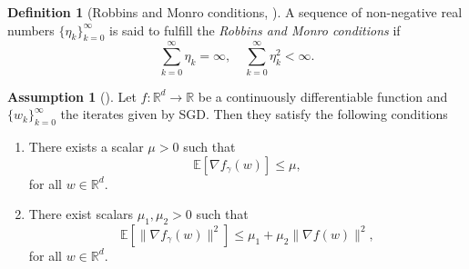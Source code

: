 \documentclass[12pt]{article}
\theoremstyle{definition}
\newtheorem{definition}[definition]{Definition}
\newtheorem{assumption}[assumption]{Assumption}
\numberwithin{equation}{section}
\newcommand{\R}{\mathbb{R}}
\newcommand{\ev}[1]{\mathbb{E}\left[{#1}\right]}
\begin{document}
\begin{definition}[Robbins and Monro conditions, \cite{robbinsStochasticApproximationMethod1951}]
  A sequence of non-negative real numbers $\{\eta_k\}_{k=0}^\infty$ is said to fulfill the \emph{Robbins and Monro conditions} if
  \begin{equation*}
    \sum_{k=0}^\infty \eta_k = \infty, \quad \sum_{k=0}^\infty \eta_k^2 < \infty.
  \end{equation*}
\end{definition}

\begin{assumption}[]
  \label{as:sgd_convergence}
  Let $f : \R^d \rightarrow \R$ be a continuously differentiable function and $\{w_k\}_{k=0}^\infty$ the iterates given by SGD. Then they satisfy the following conditions
  \begin{enumerate}[label=(\roman*)]
    \item There exists a scalar $\mu > 0$ such that 
    \begin{equation*}
      \ev{\nabla f_{\gamma}(w)} \leq \mu,
    \end{equation*}
    for all $w \in \R^d$.
    \item There exist scalars $\mu_1, \mu_2 > 0$ such that 
    \begin{equation*}
      \label{eq:variance_linear_growth}
      \ev{\lVert \nabla f_{\gamma}(w) \rVert^2} \leq \mu_1 + \mu_2 \lVert \nabla f(w) \rVert^2,
    \end{equation*}
    for all $w \in \R^d$.
  \end{enumerate}
\end{assumption}
\end{document}
